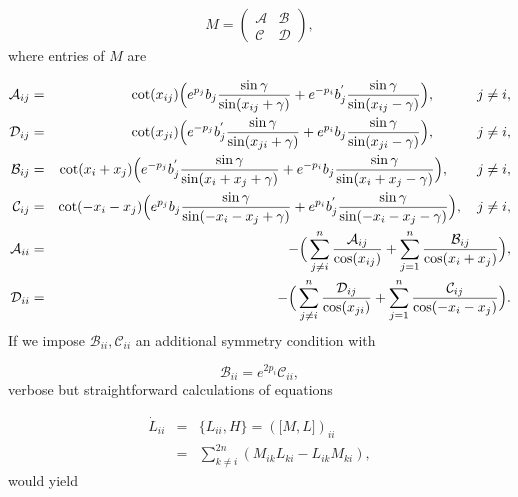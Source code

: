 \documentclass[a4paper,12pt]{article}
\begin{document}
\begin{eqnarray}
M=\left(
\begin{array}{ll}
\mathcal{A} & \mathcal{B} \\
\mathcal{C} & \mathcal{D}
\end{array}
\right),
\end{eqnarray}
where entries of $M$ are

\begin{eqnarray}
\mathcal{A}_{ij} &=&\cot (x_{ij})\Big(e^{p_{j}}b_{j}\frac{\sin \gamma }{\sin
(x_{ij}+\gamma )}+e^{-p_{i}}b_{j}^{^{\prime }}\frac{\sin \gamma }{\sin
(x_{ij}-\gamma )}\Big),~~~~~~~~~j\neq i,  \nonumber \\
\mathcal{D}_{ij} &=&\cot (x_{ji})\Big(e^{-p_{j}}b_{j}^{^{\prime }}\frac{\sin
\gamma }{\sin (x_{ji}+\gamma )}+e^{p_{i}}b_{j}\frac{\sin \gamma }{\sin
(x_{ji}-\gamma )}\Big),~~~~~~~~~j\neq i,  \nonumber \\
\mathcal{B}_{ij} &=&\cot (x_{i}+x_{j})\Big(e^{-p_{j}}b_{j}^{^{\prime }}\frac{%
\sin \gamma }{\sin (x_{i}+x_{j}+\gamma )}+e^{-p_{i}}b_{j}\frac{\sin \gamma }{%
\sin (x_{i}+x_{j}-\gamma )}\Big),~~~\ \ \ j\neq i,  \nonumber \\
\mathcal{C}_{ij} &=&\cot (-x_{i}-x_{j})\Big(e^{p_{j}}b_{j}\frac{\sin \gamma
}{\sin (-x_{i}-x_{j}+\gamma )}+e^{p_{i}}b_{j}^{^{\prime }}\frac{\sin \gamma
}{\sin (-x_{i}-x_{j}-\gamma )}\Big),~~~j\neq i,  \nonumber \\
\mathcal{A}_{ii} &=&-\Big(\sum_{j\neq i}^{n}\frac{\mathcal{A}_{ij}}{\cos
(x_{ij})}+\sum_{j=1}^{n}\frac{\mathcal{B}_{ij}}{\cos (x_{i}+x_{j})}\Big),
\nonumber \\
\mathcal{D}_{ii} &=&-\Big(\sum_{j\neq i}^{n}\frac{\mathcal{D}_{ij}}{\cos
(x_{ji})}+\sum_{j=1}^{n}\frac{\mathcal{C}_{ij}}{\cos (-x_{i}-x_{j})}\Big).
\label{me1}
\end{eqnarray}
If we impose $\mathcal{B}_{ii},\mathcal{C}_{ii}$ an additional symmetry
condition with

\begin{equation}
\mathcal{B}_{ii}=e^{2p_{i}}\mathcal{C}_{ii},
\end{equation}
verbose but straightforward calculations of equations

\begin{eqnarray}
\dot{L}_{ii} &=&\{L_{ii},H\}=(\lbrack M,L\rbrack )_{ii}  \nonumber \\
&=&\sum_{k\neq i}^{2n}(M_{ik}L_{ki}-L_{ik}M_{ki}),
\end{eqnarray}
would yield
\end{document}
